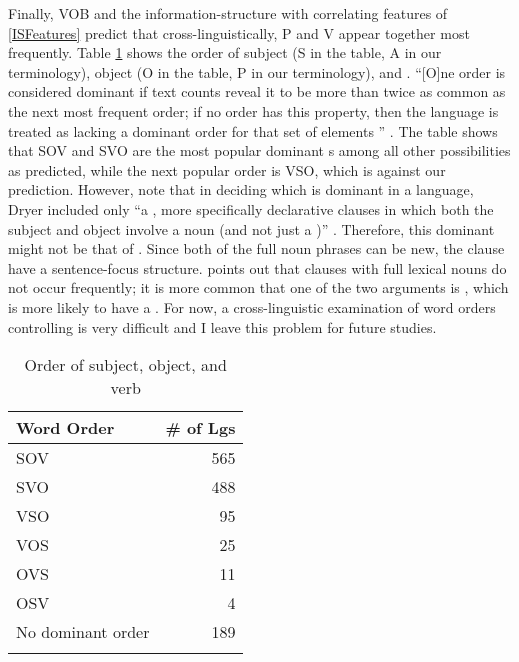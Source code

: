 Finally, VOB and the information-structure  with correlating features of  \ref{ISFeatures} predict that
cross-linguistically,
P and V appear together most frequently.
Table \ref{wals-81} shows the order of subject (S in the table, A in our terminology), object (O in the table, P in our terminology), and  \cite{wals-81}.
``[O]ne order is considered dominant if text counts reveal it to be more than twice as common as the next most frequent order; if no order has this property, then the language is treated as lacking a dominant order for that set of elements '' \cite{wals-s6}.
The table shows that
SOV and SVO are the most popular dominant s among all other possibilities as predicted,
while the next popular order is VSO,
which is against our prediction.
However, note that in deciding which  is dominant in a language,
Dryer included only
``a , more specifically declarative clauses in which both the subject and object involve a noun (and not just a )'' \cite{wals-81}.
Therefore, this dominant  might not be that of .
 Since both of the full noun phrases can be new,
the clause have a sentence-focus structure.
 \cite[as well as][]{wals-81} points out that
 clauses with full lexical nouns do not occur frequently;
it is more common that
one of the two arguments is ,
which is more likely to have a .
For now,
a cross-linguistic examination of word orders controlling  is very difficult
and I leave this problem for future studies.

\begin{table}
\centering
\caption{Order of subject, object, and verb \cite{wals-81}}
\label{wals-81}
\begin{tabular}{lr}
	\lsptoprule
	Word Order & \# of Lgs \\
	\midrule
	SOV &	565 \\
	SVO &	488 \\
	VSO &	95 \\
	VOS &	25 \\
	OVS &	11 \\
	OSV &	4 \\
	No dominant order &	189 \\
	\lspbottomrule
\end{tabular}
\end{table}



